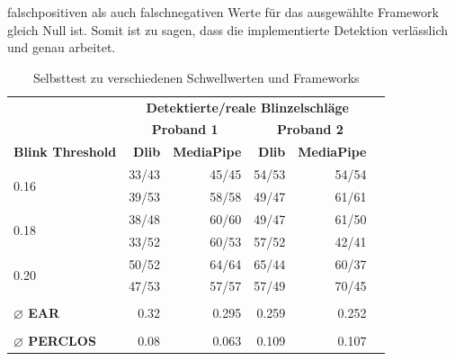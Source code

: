 falschpositiven als auch falschnegativen Werte für das ausgewählte Framework gleich Null ist. Somit ist zu sagen, dass die implementierte Detektion verlässlich und genau arbeitet. 


\begin{table}[!htp]\centering
	\scriptsize
	\begin{tabular}{lrrrrr}%
		&\multicolumn{4}{c}{\textbf{Detektierte/reale Blinzelschläge}} \\\cmidrule{2-5}
		&\multicolumn{2}{c}{\textbf{Proband 1}} &\multicolumn{2}{c}{\textbf{Proband 2}} \\\cmidrule{2-5}
		\textbf{Blink Threshold} &\textbf{Dlib} &\textbf{MediaPipe} &\textbf{Dlib} &\textbf{MediaPipe} \\\midrule
		\multirow{2}{*}{0.16} &33/43 &45/45 &54/53 &54/54 \\
		&39/53 &58/58 &49/47 &61/61 \\
		\multirow{2}{*}{0.18} &38/48 &60/60 &49/47 &61/50 \\
		&33/52 &60/53 &57/52 &42/41 \\
		\multirow{2}{*}{0.20} &50/52 &64/64 &65/44 &60/37 \\
		&47/53 &57/57 &57/49 &70/45 \\
		& & & & \\
		\textbf{$\varnothing$ EAR} &0.32 &0.295 &0.259 &0.252 \\
		& & & & \\
		\textbf{$\varnothing$ PERCLOS} &0.08 &0.063 &0.109 &0.107 \\
	\end{tabular}
	\caption{Selbsttest zu verschiedenen Schwellwerten und Frameworks}\label{table:selbsttest}
\end{table}


